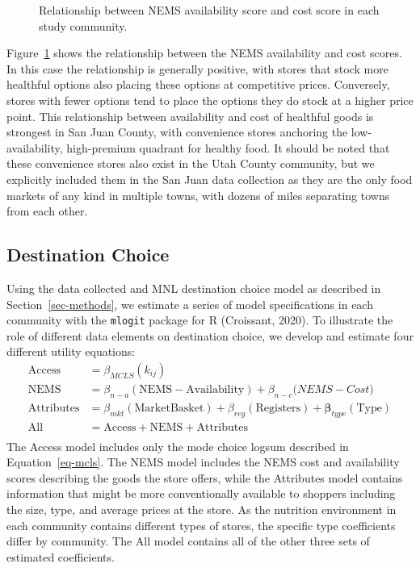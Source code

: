 \documentclass[
  letterpaper,
  number,
  review,
  doubleblind,
  3p]{elsarticle}
\begin{document}
\begin{figure}


\caption{\label{fig-nems-cost-avail}Relationship between NEMS
availability score and cost score in each study community.}

\end{figure}%

Figure~\ref{fig-nems-cost-avail} shows the relationship between the NEMS
availability and cost scores. In this case the relationship is generally
positive, with stores that stock more healthful options also placing
these options at competitive prices. Conversely, stores with fewer
options tend to place the options they do stock at a higher price point.
This relationship between availability and cost of healthful goods is
strongest in San Juan County, with convenience stores anchoring the
low-availability, high-premium quadrant for healthy food. It should be
noted that these convenience stores also exist in the Utah County
community, but we explicitly included them in the San Juan data
collection as they are the only food markets of any kind in multiple
towns, with dozens of miles separating towns from each other.

\subsection{Destination Choice}\label{sec-estimation}

Using the data collected and MNL destination choice model as described
in Section~\ref{sec-methods}, we estimate a series of model
specifications in each community with the \texttt{mlogit} package for R
(Croissant, 2020). To illustrate the role of different data elements on
destination choice, we develop and estimate four different utility
equations: \begin{align*}
\mathrm{Access} &= \beta_{MCLS}( k_{ij})\\
\mathrm{NEMS} &= \beta_{n-a} (\mathrm{NEMS-Availability}) + \beta_{n-c}\mathrm({NEMS-Cost})\\
\mathrm{Attributes} &= \beta_{mkt} (\mathrm{Market Basket}) + \beta_{reg} (\mathrm{Registers}) + \mathbf{\beta}_{type}(\mathrm{Type})\\
\mathrm{All} &= \mathrm{Access} + \mathrm{NEMS} + \mathrm{Attributes}\\
\end{align*} The Access model includes only the mode choice logsum
described in Equation~\ref{eq-mcls}. The NEMS model includes the NEMS
cost and availability scores describing the goods the store offers,
while the Attributes model contains information that might be more
conventionally available to shoppers including the size, type, and
average prices at the store. As the nutrition environment in each
community contains different types of stores, the specific type
coefficients differ by community. The All model contains all of the
other three sets of estimated coefficients.
\end{document}
